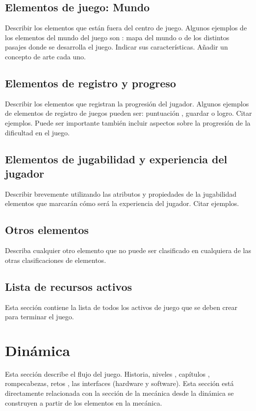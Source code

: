 \subsection{Elementos de juego: Mundo}
Describir los elementos que están fuera del centro de juego. Algunos ejemplos de los elementos del mundo del juego son : mapa del mundo o de los distintos pasajes donde se desarrolla el juego. Indicar sus características. Añadir un concepto de arte cada uno.

\subsection{Elementos de registro y progreso}
Describir los elementos que registran la progresión del jugador. Algunos ejemplos de elementos de registro de juegos pueden ser: puntuación , guardar o logro. Citar ejemplos. Puede ser importante también incluir aspectos sobre la progresión de la dificultad en el juego.

\subsection{Elementos de jugabilidad y experiencia del jugador}
Describir brevemente utilizando las atributos y propiedades de la jugabilidad elementos que marcarán cómo será la experiencia del jugador. Citar ejemplos.

\subsection{Otros elementos}
Describa cualquier otro elemento que no puede ser clasificado en cualquiera de las otras clasificaciones de elementos.

\subsection{Lista de recursos activos}
Esta sección contiene la lista de todos los activos de juego que se deben crear para terminar el juego.


\section{Dinámica}
Esta sección describe el flujo del juego. Historia, niveles , capítulos , rompecabezas, retos , las interfaces (hardware y software). Esta sección está directamente relacionada con la sección de la mecánica desde la dinámica se construyen a partir de los elementos en la mecánica.


